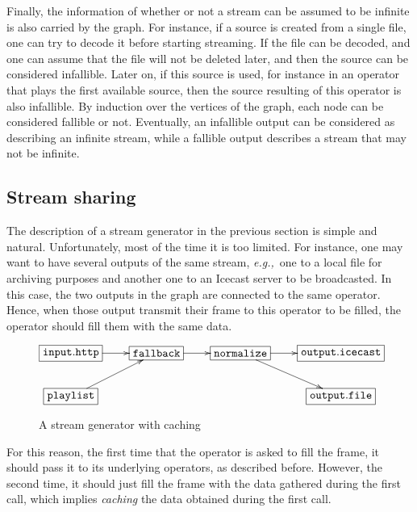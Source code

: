 \documentclass{llncs}
\newcommand{\eg}{{\em e.g.,}}
\begin{document}
Finally, the information of whether or not a stream can be assumed to be infinite is also carried by the 
graph. For instance, if a source is created from a single file, one can try to decode it before starting 
streaming. If the file can be decoded, and one can assume that the file will not be deleted later, and then 
the source can be considered infallible. Later on, if this source is used, for instance in an operator that plays 
the first available source, then the source resulting of this operator is also infallible.
By induction over the vertices of the graph, each node can be considered fallible or not. Eventually,
an infallible output can be considered as describing an infinite stream, while a fallible
output describes a stream that may not be infinite.

\subsection*{Stream sharing}

The description of a stream generator in the previous section is simple and 
natural. Unfortunately, most of the time it is too limited. For instance, one 
may want to have several outputs of the same 
stream, \eg\ one to a local file for archiving purposes and another one to an Icecast server to be
broadcasted.
In this case, the two outputs in the graph are connected to the same operator. Hence, when those output
transmit their frame to this operator to be filled, the operator should fill them with the same data.

\begin{figure}[htn]
 \begin{center}
\[
\xymatrix{
  *+[F]{\mathtt{input.http}}\ar[r]&*+[F]{\mathtt{fallback}}\ar[r]&
  *+[F]{\mathtt{normalize}}\ar[r]\ar[dr]&
  *+[F]{\mathtt{output.icecast}}\\
  *+[F]{\mathtt{playlist}}\ar[ur]& & & *+[F]{\mathtt{output.file}}\\
}
\]
\end{center}
 \caption{A stream generator with caching}
\end{figure}


For this reason, the first time that the operator is asked to fill the frame, it should pass it to its 
underlying operators, as described before. However, the second time, it should just fill the frame 
with the data gathered during the first call, which implies \textit{caching} the data obtained during the first call.
\end{document}
